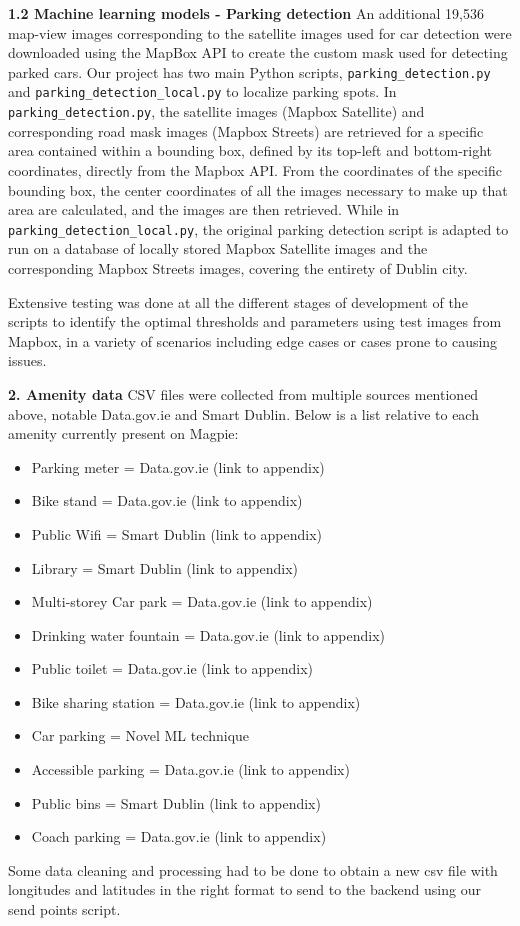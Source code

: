 \textbf{1.2 Machine learning models - Parking detection}
An additional 19,536 map-view images corresponding to the satellite images used
for car detection were downloaded using the MapBox API to create the custom mask
used for detecting parked cars. Our project has two main Python scripts,
\texttt{parking\_detection.py} and \texttt{parking\_detection\_local.py} to
localize parking spots. In \texttt{parking\_detection.py}, the satellite images
(Mapbox Satellite) and corresponding road mask images (Mapbox Streets) are
retrieved for a specific area contained within a bounding box, defined by its
top-left and bottom-right coordinates, directly from the Mapbox API. From the
coordinates of the specific bounding box, the center coordinates of all the
images necessary to make up that area are calculated, and the images are then
retrieved. While in \texttt{parking\_detection\_local.py}, the original parking
detection script is adapted to run on a database of locally stored Mapbox
Satellite images and the corresponding Mapbox Streets images, covering the
entirety of Dublin city.

Extensive testing was done at all the different stages of development of the
scripts to identify the optimal thresholds and parameters using test images from
Mapbox, in a variety of scenarios including edge cases or cases prone to causing
issues.

\newpage{}

\textbf{2. Amenity data}
CSV files were collected from multiple sources mentioned above, notable
Data.gov.ie and Smart Dublin. Below is a list relative to each amenity currently
present on Magpie:
\begin{itemize}
    \item Parking meter = Data.gov.ie (link to appendix)
    \item Bike stand = Data.gov.ie (link to appendix)
    \item Public Wifi = Smart Dublin (link to appendix)
    \item Library = Smart Dublin (link to appendix)
    \item Multi-storey Car park = Data.gov.ie (link to appendix)
    \item Drinking water fountain = Data.gov.ie (link to appendix)
    \item Public toilet = Data.gov.ie (link to appendix)
    \item Bike sharing station = Data.gov.ie (link to appendix)
    \item Car parking = Novel ML technique
    \item Accessible parking = Data.gov.ie (link to appendix)
    \item Public bins = Smart Dublin (link to appendix)
    \item Coach parking = Data.gov.ie (link to appendix)
\end{itemize}
Some data cleaning and processing had to be done to obtain a new csv file with
longitudes and latitudes in the right format to send to the backend using our
send points script.

